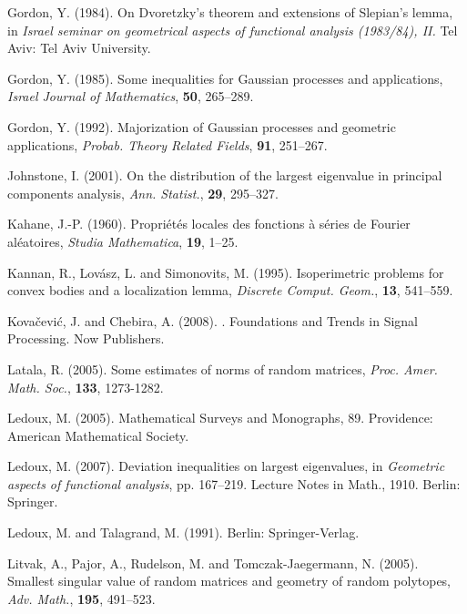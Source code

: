 \documentclass[10pt, openany]{book}
\theoremstyle{remark}
\begin{document}
\begin{thebibliography}{}
 Gordon, Y. (1984).
  \newblock On Dvoretzky's theorem and extensions of Slepian's lemma,
  in {\em Israel seminar on geometrical aspects of functional analysis (1983/84), II.}
  Tel Aviv: Tel Aviv University.

 Gordon, Y. (1985).
  \newblock Some inequalities for Gaussian processes and applications,
  {\em Israel Journal of Mathematics}, {\bf 50}, 265--289.

 Gordon, Y. (1992).
  \newblock Majorization of Gaussian processes and geometric applications,
  {\em Probab. Theory Related Fields}, {\bf 91}, 251--267.
  
 Johnstone, I. (2001).
  \newblock On the distribution of the largest eigenvalue in principal components analysis,  
  {\em Ann. Statist.}, {\bf 29}, 295--327.

 Kahane, J.-P. (1960).
  \newblock Propri\'et\'es locales des fonctions \`a s\'eries de {F}ourier al\'eatoires,
  {\em Studia Mathematica}, {\bf 19}, 1--25.

 Kannan, R., Lov\'asz, L. and Simonovits, M. (1995).
  \newblock Isoperimetric problems for convex bodies and a localization lemma,
  {\em Discrete Comput. Geom.}, {\bf 13}, 541--559.

 Kova\v{c}evi\'c, J. and Chebira, A. (2008). 
  . 
  Foundations and Trends in Signal Processing. 
  Now Publishers.
 
  Latala, R. (2005).
  \newblock Some estimates of norms of random matrices,
  {\em Proc. Amer. Math. Soc.}, {\bf 133}, 1273-1282.

 Ledoux, M. (2005).
  Mathematical Surveys and Monographs, 89. 
  Providence: American Mathematical Society.
  
 Ledoux, M. (2007).
  \newblock Deviation inequalities on largest eigenvalues,
  in {\em Geometric aspects of functional analysis},  pp. 167--219. 
  Lecture Notes in Math., 1910. Berlin: Springer.
  
 Ledoux, M. and Talagrand, M. (1991).
  Berlin: Springer-Verlag.
  
 Litvak, A., Pajor, A., Rudelson, M. and Tomczak-Jaegermann, N. (2005).
  \newblock Smallest singular value of random matrices and geometry of random polytopes,
  {\em Adv. Math.}, {\bf 195}, 491--523.


\end{thebibliography}
\end{document}
